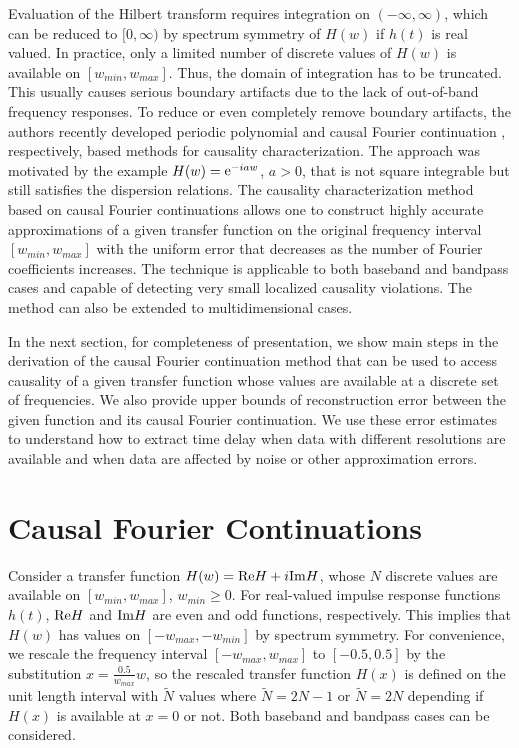 \documentclass[journal,twoside]{IEEEtran}
\begin{document}
Evaluation of the Hilbert transform requires integration on $(-\infty,\infty)$, which can be reduced to $[0,\infty)$ by spectrum symmetry of $H(w)$ if $h(t)$ is real valued.
 In practice, only a limited number of discrete values of  $H(w)$ is   available  on $[w_{min},w_{max}]$. Thus, the domain of integration has to be truncated. This usually causes serious boundary artifacts due to the lack of out-of-band frequency responses. To reduce or even completely remove boundary artifacts,  the authors recently developed periodic polynomial \cite{Aboutaleb_Barannyk_Elshabini_Barlow_WMED13, Barannyk_Aboutaleb_Elshabini_Barlow_IMAPS} and causal Fourier continuation \cite{Barannyk_Aboutaleb_Elshabini_Barlow_IMAPS2014, Barannyk_Aboutaleb_Elshabini_Barlow_IEEE}, respectively, based methods for causality characterization. The approach was motivated by the  example $H(w)={\mathop{\rm e}\nolimits}^{-iaw}$, $a>0$, that is not square integrable but still satisfies the dispersion relations. The causality characterization method based on causal Fourier continuations allows one to construct highly  accurate approximations of a given transfer function on the original frequency interval $[w_{min},w_{max}]$ with the uniform error that decreases as the number of Fourier coefficients increases. The technique is applicable to both  baseband and  bandpass cases and capable of detecting very small localized causality violations. The method can also be extended to  multidimensional cases. 
 
In the next section, for completeness of presentation, we show main steps in the derivation of the causal Fourier continuation method that can be used to access causality of a given transfer function whose values are available at a discrete set of frequencies. We also provide upper bounds of reconstruction error between the given function and its causal Fourier continuation. We use these error estimates to understand  how to extract time delay when data with different resolutions are available and when data are affected by noise or other approximation errors.
 
 
 

 
 
 

\section{Causal Fourier Continuations} \label{Fourier_continuation}

Consider a transfer function $H(w)={\mathop{\rm Re}\nolimits} H+i{\mathop{\rm Im}\nolimits} H$, whose $N$ discrete values are available on $[w_{min}, w_{max}]$, $w_{min}\geq 0$. For real-valued impulse response functions $h(t)$, ${\mathop{\rm Re}\nolimits} H$ and ${\mathop{\rm Im}\nolimits} H$ are even and odd functions, respectively. This implies that $H(w)$ has values on $[-w_{max},-w_{min}]$ by spectrum symmetry. For convenience, we rescale the frequency interval $[-w_{max},w_{max}]$ to $[-0.5,0.5]$ by the substitution $x=\frac{0.5}{w_{max}}w$, so the rescaled transfer function $H(x)$ is defined on the unit length interval with $\tilde N$ values where  $\tilde N=2N-1$ or $\tilde N=2N$ depending if $H(x)$ is available at $x=0$ or not. Both baseband and bandpass cases can be considered.
\end{document}
